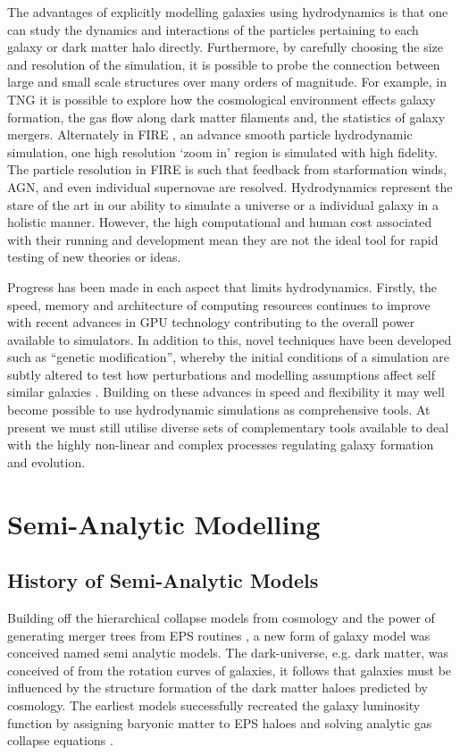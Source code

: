 The advantages of explicitly modelling galaxies using hydrodynamics is that one can study the dynamics and interactions of the particles pertaining to each galaxy or dark matter halo directly. Furthermore, by carefully choosing the size and resolution of the simulation, it is possible to probe the connection between large and small scale structures over many orders of magnitude. For example, in TNG it is possible to explore how the cosmological environment effects galaxy formation, the gas flow along dark matter filaments and, the statistics of galaxy mergers. 
Alternately in FIRE \cite{Hopkins2018FIRE-2Formation}, an advance smooth particle hydrodynamic simulation, one high resolution `zoom in' region is simulated with high fidelity. The particle resolution in FIRE is such that feedback from starformation winds, AGN, and even individual supernovae are resolved. Hydrodynamics represent the stare of the art in our ability to simulate a universe or a individual galaxy in a holistic manner. However, the high computational and human cost associated with their running and development mean they are not the ideal tool for rapid testing of new theories or ideas. 

Progress has been made in each aspect that limits hydrodynamics. Firstly, the speed, memory and architecture of computing resources continues to improve with recent advances in GPU technology contributing to the overall power available to simulators. In addition to this, novel techniques have been developed such as ``genetic modification'', whereby the initial conditions of a simulation are subtly altered to test how perturbations and modelling assumptions affect self similar galaxies \citep{Pontzen2017HowGalaxy}. Building on these advances in speed and flexibility it may well become possible to use hydrodynamic simulations as comprehensive tools. At present we must still utilise diverse sets of complementary tools available to deal with the highly non-linear and complex processes regulating galaxy formation and evolution.

\section{Semi-Analytic Modelling}
\label{sec:SAM}
\subsection{History of Semi-Analytic Models}
Building off the hierarchical collapse models from \LCDM cosmology and the power of generating merger trees from EPS routines \citep{Press1974}, a new form of galaxy model was conceived named semi analytic models. The dark-universe, e.g. dark matter, was conceived of from the rotation curves of galaxies, it follows that galaxies must be influenced by the structure formation of the dark matter haloes predicted by \LCDM cosmology. The earliest models successfully recreated the galaxy luminosity function by assigning baryonic matter to EPS haloes and solving analytic gas collapse equations \citep{White1978CoreClustering}.

